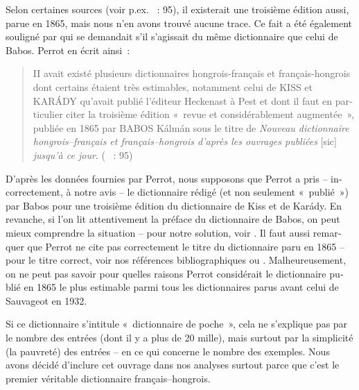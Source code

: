 \documentclass[output=paper,colorlinks,citecolor=brown,arabicfont,chinesefont,booklanguage=french]{langscibook}
\begin{document}
\begin{otherlanguage}{french}
Selon certaines sources (voir p.ex. \citealt{Perrot1992} ~: 95), il existerait une troisième édition aussi, parue en 1865, mais nous n’en avons trouvé aucune trace. Ce fait a été également souligné par \citet[80]{Szabo2011} qui se demandait s’il s’agissait du même dictionnaire que celui de Babos. Perrot en écrit ainsi~:

\begin{quote}
    II avait existé plusieurs dictionnaires hongrois-français et français-hongrois dont certains étaient très estimables, notamment celui de KISS et KARÁDY qu'avait publié l'éditeur Heckenast à Pest et dont il faut en particulier citer la troisième édition «~revue et considérablement augmentée~», publiée en 1865 par BABOS Kálmán sous le titre de \emph{Nouveau dictionnaire hongrois–français et français–hongrois d'après les ouvrages publiées} [sic] \emph{jusqu'à ce jour}. (\citealt{Perrot1992} ~: 95)
\end{quote}

D’après les données fournies par Perrot, nous supposons que Perrot a pris – incorrectement, à notre avis – le dictionnaire rédigé (et non seulement «~publié~») par Babos pour une troisième édition du dictionnaire de Kiss et de Karády. En revanche, si l’on lit attentivement la préface du dictionnaire de Babos, on peut mieux comprendre la situation – pour notre solution, voir . Il faut aussi remarquer que Perrot ne cite pas correctement le titre du dictionnaire paru en 1865 – pour le titre correct, voir nos références bibliographiques ou . Malheureusement, on ne peut pas savoir pour quelles raisons Perrot considérait le dictionnaire publié en 1865 le plus estimable parmi tous les dictionnaires parus avant celui de Sauvageot en 1932.

Si ce dictionnaire s’intitule «~dictionnaire de poche~», cela ne s’explique pas par le nombre des entrées (dont il y a plus de 20 mille), mais surtout par la simplicité (la pauvreté) des entrées – en ce qui concerne le nombre des exemples. Nous avons décidé d’inclure cet ouvrage dans nos analyses surtout parce que c'est le premier véritable dictionnaire français–hongrois.

\subsubsection{\citealt{Babos1865}}


\end{otherlanguage}
\end{document}
